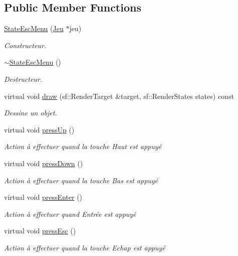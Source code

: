 \subsection*{Public Member Functions}
\begin{DoxyCompactItemize}
\item 
\hyperlink{class_state_esc_menu_ac73762653b28be7e912641712d774a15}{State\+Esc\+Menu} (\hyperlink{class_jeu}{Jeu} $\ast$jeu)
\begin{DoxyCompactList}\small\item\em Constructeur. \end{DoxyCompactList}\item 
\hyperlink{class_state_esc_menu_a5eb2aad9f7cc85e772859fe95d7f28a7}{$\sim$\+State\+Esc\+Menu} ()
\begin{DoxyCompactList}\small\item\em Destructeur. \end{DoxyCompactList}\item 
virtual void \hyperlink{class_state_esc_menu_a6ab405b062d3caad840036c4d38d895b}{draw} (sf\+::\+Render\+Target \&target, sf\+::\+Render\+States states) const 
\begin{DoxyCompactList}\small\item\em Dessine un objet. \end{DoxyCompactList}\item 
virtual void \hyperlink{class_state_esc_menu_a455940a22b887bf3289d5837d089d6b5}{press\+Up} ()
\begin{DoxyCompactList}\small\item\em Action à effectuer quand la touche Haut est appuyé \end{DoxyCompactList}\item 
virtual void \hyperlink{class_state_esc_menu_a412f7eead9e8103468abc5c099e50a69}{press\+Down} ()
\begin{DoxyCompactList}\small\item\em Action à effectuer quand la touche Bas est appuyé \end{DoxyCompactList}\item 
virtual void \hyperlink{class_state_esc_menu_ab791b49eaf53562f13eb4d11378821c2}{press\+Enter} ()
\begin{DoxyCompactList}\small\item\em Action à effectuer quand Entrée est appuyé \end{DoxyCompactList}\item 
virtual void \hyperlink{class_state_esc_menu_ae9075e15b4ff41ecc16ed1b38b73ef2c}{press\+Esc} ()
\begin{DoxyCompactList}\small\item\em Action à effectuer quand la touche Echap est appuyé \end{DoxyCompactList}\end{DoxyCompactItemize}
